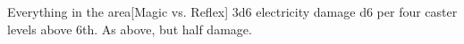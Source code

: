 \begin{spellheader}
\end{spellheader}
\begin{spelleffects}
    \begin{spelltarget}{Everything in the area}[Magic vs. Reflex]
        \spellsuccess 3d6 electricity damage \add d6 per four caster levels above 6th.
        \spellfailure As above, but half damage.
    \end{spelltarget}
\end{spelleffects}
\begin{spellfooter}
    \spellnotes \destructivespellnotes
\end{spellfooter}

